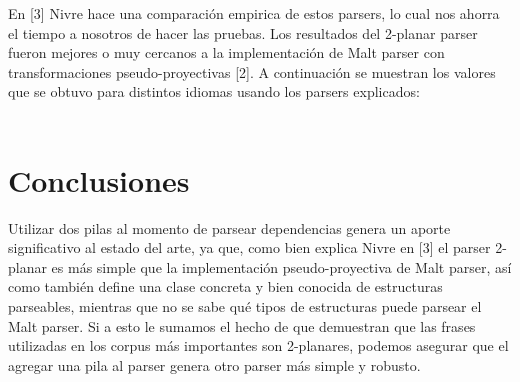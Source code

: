 \documentclass[11pt,a4paper,spanish]{article}
\begin{document}
En [3] Nivre hace una comparación empirica de estos parsers, lo cual nos ahorra el tiempo a nosotros 
de hacer las pruebas. Los resultados del 2-planar parser fueron mejores o muy cercanos a la implementación de Malt parser con transformaciones pseudo-proyectivas [2]. A continuación se 
muestran los valores que se obtuvo para distintos idiomas usando los parsers explicados: \\ \\
\begin{table}[h]
\caption{Accuracy del parsing para el 2-planar parser (2P) comparado con Malt parser con 
transformaciones pseudo-proyectivas (M). LAS = Labeled Attachment Score; UAS = Unlabeled Attachment Score; NPP = Precision on Non-Projective arcs; NPR = Recall on Non-Projective arcs.}
\end{table}

\newpage
\section{Conclusiones}

Utilizar dos pilas al momento de parsear dependencias genera un aporte significativo al estado del arte, ya que, como bien explica Nivre en [3] el parser 2-planar es más simple que la implementación pseudo-proyectiva de Malt parser, así como también define una clase concreta y bien conocida de estructuras parseables, mientras que no se sabe qué tipos de estructuras puede parsear el Malt parser. Si a esto le sumamos el hecho de que demuestran que las frases utilizadas en los corpus más importantes son 2-planares, podemos asegurar que el agregar una pila al parser genera otro parser más simple y robusto.
\end{document}
